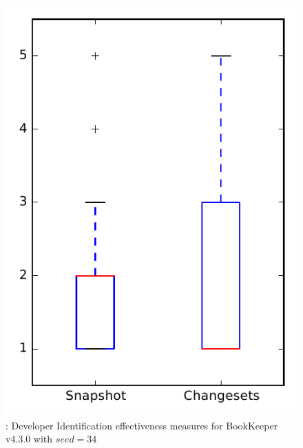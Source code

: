 
\begin{figure}
\centering
\includegraphics[height=0.4\textheight]{figures/dit_seed/rq1_bookkeeper_34}
\caption{\rtwo: Developer Identification effectiveness measures for BookKeeper v4.3.0 with $seed=34$}
\label{fig:dit_seed:rq1:bookkeeper}
\end{figure}
